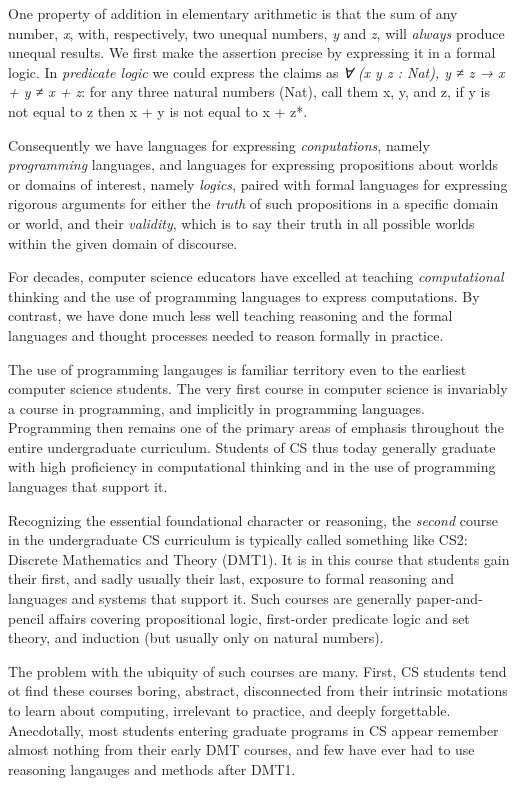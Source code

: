 \documentclass{book}
\begin{document}
One property of addition in elementary arithmetic is that the sum of any number, \emph{x}, with, respectively, two unequal numbers, \emph{y} and \emph{z}, will \emph{always} produce unequal results. We first make the assertion precise by expressing it in a formal logic. In  \emph{predicate logic} we could express the claims as \emph{∀ (x y z : Nat), y ≠ z → x + y ≠ x + z}: for any three natural numbers (Nat), call them x, y, and z, if y is not equal to z then x + y is not equal to x + z*.

Consequently we have languages for expressing \emph{conputations}, namely \emph{programming} languages, and languages for expressing propositions about worlds or domains of interest, namely \emph{logics}, paired with formal languages for expressing rigorous arguments for either the \emph{truth} of such propositions in a specific domain or world, and their \emph{validity}, which is to say their truth in all possible worlds within the given domain of discourse.

For decades, computer science educators have excelled at teaching \emph{computational} thinking and the use of programming languages to express computations. By contrast, we have done much less well teaching reasoning and the formal languages and thought processes needed to reason formally in practice.

The use of programming langauges is familiar territory even to the earliest computer science students. The very first course in computer science is invariably a course in programming, and implicitly in programming languages. Programming then remains one of the primary areas of emphasis throughout the entire undergraduate curriculum. Students of CS thus today generally graduate with high proficiency in computational thinking and in the use of programming languages that support it.

Recognizing the essential foundational character or reasoning, the \emph{second} course in the undergraduate CS curriculum is typically called something like CS2: Discrete Mathematics and Theory (DMT1). It is in this course that students gain their first, and sadly usually their last, exposure to formal reasoning and languages and systems that support it. Such courses are generally paper-and-pencil affairs covering propositional logic, first-order predicate logic and set theory, and induction (but usually only on natural numbers).

The problem with the ubiquity of such courses are many. First, CS students tend ot find these courses boring, abstract, disconnected from their intrinsic motations to learn about computing, irrelevant to practice, and deeply forgettable.  Anecdotally, most students entering graduate programs in CS appear remember almost nothing from their early DMT courses, and few have ever had to use reasoning langauges and methods after DMT1.
\end{document}
